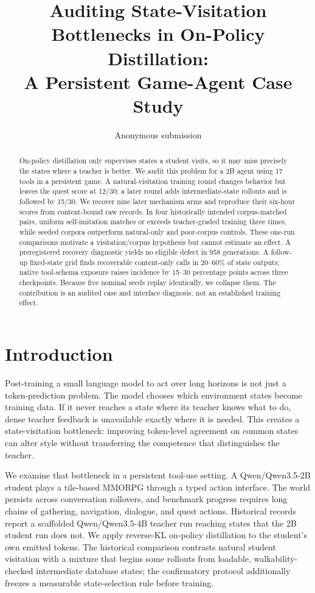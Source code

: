 \documentclass[11pt,a4paper]{article}
\title{Auditing State-Visitation Bottlenecks in On-Policy Distillation:\\
A Persistent Game-Agent Case Study}
\author{Anonymous submission}
\begin{document}
\maketitle

\begin{abstract}
On-policy distillation only supervises states a student visits, so it may miss
precisely the states where a teacher is better. We audit this problem for a 2B
agent using 17 tools in a persistent game. A natural-visitation training round
changes behavior but leaves the quest score at 12/30; a later round adds
intermediate-state rollouts and is followed by 15/30. We recover nine later
mechanism arms and reproduce their six-hour scores from content-bound raw
records. In four historically intended corpus-matched pairs, uniform
self-imitation matches or exceeds teacher-graded training three times, while
seeded corpora outperform natural-only and poor-corpus controls. These one-run
comparisons motivate a visitation/corpus hypothesis but cannot estimate an
effect. A preregistered recovery diagnostic yields no eligible defect in 958
generations. A follow-up fixed-state grid finds recoverable content-only calls
in 20--60\% of state outputs; native tool-schema exposure raises incidence by
15--30 percentage points across three checkpoints. Because five nominal seeds
replay identically, we collapse them. The contribution is an audited case and
interface diagnosis, not an established training effect.
\end{abstract}

\section{Introduction}

Post-training a small language model to act over long horizons is not just a
token-prediction problem. The model chooses which environment states become
training data. If it never reaches a state where its teacher knows what to do,
dense teacher feedback is unavailable exactly where it is needed. This creates
a state-visitation bottleneck: improving token-level agreement on common states
can alter style without transferring the competence that distinguishes the
teacher.

We examine that bottleneck in a persistent tool-use setting. A
Qwen/Qwen3.5-2B student \citep{qwen35modelcards2026} plays a tile-based MMORPG
through a typed action interface. The world
persists across conversation rollovers, and benchmark progress requires long
chains of gathering, navigation, dialogue, and quest actions. Historical
records report a scaffolded Qwen/Qwen3.5-4B teacher run reaching states that the
2B student run does not. We apply reverse-KL
on-policy distillation to the student's own emitted tokens. The historical
comparison contrasts natural student visitation with a mixture that begins some
rollouts from loadable, walkability-checked intermediate database states; the confirmatory protocol
additionally freezes a measurable state-selection rule before training.
\end{document}
